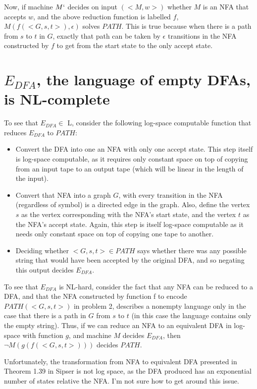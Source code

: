 \documentclass[11pt]{article}
\renewcommand{\=}[1]{\stackrel{#1}{=}} %
\theoremstyle{definition}
\begin{document}
Now, if machine $M`$ decides on input $(<M,w>)$ whether $M$ is an NFA that accepts $w$, and the above reduction function is labelled $f$, $M(f(<G,s,t>), \epsilon)$ solves $PATH$. This is true because when there is a path from $s$ to $t$ in $G$, exactly that path can be taken by $\epsilon$ transitions in the NFA constructed by $f$ to get from the start state to the only accept state. 


\section{$E_{DFA}$, the language of empty DFAs, is NL-complete}
To see that $E_{DFA} \in$ L, consider the following log-space computable function that reduces $E_{DFA}$ to $PATH$:
\begin{itemize}
\item Convert the DFA into one an NFA with only one accept state. This step itself is log-space computable, as it requires only constant space on top of copying from an input tape to an output tape (which will be linear in the length of the input).
\item Convert that NFA into a graph $G$, with every transition in the NFA (regardless of symbol) is a directed edge in the graph. Also, define the vertex $s$ as the vertex corresponding with the NFA's start state, and the vertex $t$ as the NFA's accept state. Again, this step is itself log-space computable as it needs only constant space on top of copying one tape to another. 
\item Deciding whether $<G,s,t> \in PATH$ says whether there was any possible string that would have been accepted by the original DFA, and so negating this output decides $E_{DFA}$.
\end{itemize}

To see that $E_{DFA}$ is NL-hard, consider the fact that any NFA can be reduced to a DFA, and that the NFA constructed by function f to encode $PATH(<G,s,t>)$ in problem 2, describes a nonempty language only in the case that there is a path in $G$ from $s$ to $t$ (in this case the language contains only the empty string). Thus, if we can reduce an NFA to an equivalent DFA in log-space with function $g$, and machine $M$ decides $E_{DFA}$, then $\neg M(g(f(<G,s,t>)))$ decides $PATH$.

Unfortunately, the transformation from NFA to equivalent DFA presented in Theorem 1.39 in Sipser is not log space, as the DFA produced has an exponential number of states relative the NFA. I'm not sure how to get around this issue.

 
\end{document}
